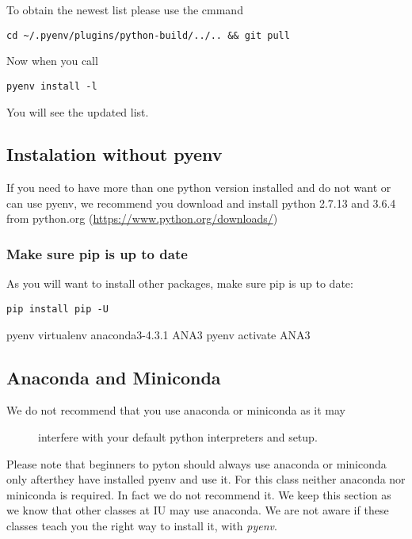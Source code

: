 To obtain the newest list please use the cmmand

\begin{lstlisting}
cd ~/.pyenv/plugins/python-build/../.. && git pull
\end{lstlisting}

Now when you call 

\begin{lstlisting}
pyenv install -l
\end{lstlisting}

You will see the updated list.

\subsection{Instalation without
pyenv}\label{instalation-without-pyenv-1}

If you need to have more than one python version installed and do not
want or can use pyenv, we recommend you download and install python
2.7.13 and 3.6.4 from python.org
(\url{https://www.python.org/downloads/})

\subsubsection{Make sure pip is up to
date}\label{make-sure-pip-is-up-to-date}

As you will want to install other packages, make sure pip is up to date:

\begin{verbatim}
pip install pip -U
\end{verbatim}

pyenv virtualenv anaconda3-4.3.1 ANA3 pyenv activate ANA3

\subsection{Anaconda and Miniconda}\label{anaconda-and-miniconda}

\begin{description}
\item[We do not recommend that you use anaconda or miniconda as it may]
interfere with your default python interpreters and setup.
\end{description}

Please note that beginners to pyton should always use anaconda or
miniconda only afterthey have installed pyenv and use it. For this class
neither anaconda nor miniconda is required. In fact we do not recommend
it. We keep this section as we know that other classes at IU may use
anaconda. We are not aware if these classes teach you the right way to
install it, with \emph{pyenv}.

